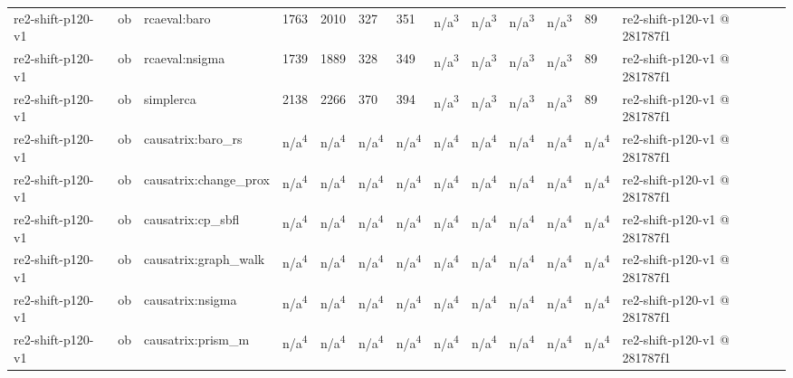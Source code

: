 \begin{table}[t]
\begin{tabular}{lllllllllllll}
re2-shift-p120-v1 & ob & rcaeval:baro & 1763 & 2010 & 327 & 351 & n/a\textsuperscript{3} & n/a\textsuperscript{3} & n/a\textsuperscript{3} & n/a\textsuperscript{3} & 89 & re2-shift-p120-v1 @ 281787f1 \\
re2-shift-p120-v1 & ob & rcaeval:nsigma & 1739 & 1889 & 328 & 349 & n/a\textsuperscript{3} & n/a\textsuperscript{3} & n/a\textsuperscript{3} & n/a\textsuperscript{3} & 89 & re2-shift-p120-v1 @ 281787f1 \\
re2-shift-p120-v1 & ob & simplerca & 2138 & 2266 & 370 & 394 & n/a\textsuperscript{3} & n/a\textsuperscript{3} & n/a\textsuperscript{3} & n/a\textsuperscript{3} & 89 & re2-shift-p120-v1 @ 281787f1 \\
re2-shift-p120-v1 & ob & causatrix:baro\_rs & n/a\textsuperscript{4} & n/a\textsuperscript{4} & n/a\textsuperscript{4} & n/a\textsuperscript{4} & n/a\textsuperscript{4} & n/a\textsuperscript{4} & n/a\textsuperscript{4} & n/a\textsuperscript{4} & n/a\textsuperscript{4} & re2-shift-p120-v1 @ 281787f1 \\
re2-shift-p120-v1 & ob & causatrix:change\_prox & n/a\textsuperscript{4} & n/a\textsuperscript{4} & n/a\textsuperscript{4} & n/a\textsuperscript{4} & n/a\textsuperscript{4} & n/a\textsuperscript{4} & n/a\textsuperscript{4} & n/a\textsuperscript{4} & n/a\textsuperscript{4} & re2-shift-p120-v1 @ 281787f1 \\
re2-shift-p120-v1 & ob & causatrix:cp\_sbfl & n/a\textsuperscript{4} & n/a\textsuperscript{4} & n/a\textsuperscript{4} & n/a\textsuperscript{4} & n/a\textsuperscript{4} & n/a\textsuperscript{4} & n/a\textsuperscript{4} & n/a\textsuperscript{4} & n/a\textsuperscript{4} & re2-shift-p120-v1 @ 281787f1 \\
re2-shift-p120-v1 & ob & causatrix:graph\_walk & n/a\textsuperscript{4} & n/a\textsuperscript{4} & n/a\textsuperscript{4} & n/a\textsuperscript{4} & n/a\textsuperscript{4} & n/a\textsuperscript{4} & n/a\textsuperscript{4} & n/a\textsuperscript{4} & n/a\textsuperscript{4} & re2-shift-p120-v1 @ 281787f1 \\
re2-shift-p120-v1 & ob & causatrix:nsigma & n/a\textsuperscript{4} & n/a\textsuperscript{4} & n/a\textsuperscript{4} & n/a\textsuperscript{4} & n/a\textsuperscript{4} & n/a\textsuperscript{4} & n/a\textsuperscript{4} & n/a\textsuperscript{4} & n/a\textsuperscript{4} & re2-shift-p120-v1 @ 281787f1 \\
re2-shift-p120-v1 & ob & causatrix:prism\_m & n/a\textsuperscript{4} & n/a\textsuperscript{4} & n/a\textsuperscript{4} & n/a\textsuperscript{4} & n/a\textsuperscript{4} & n/a\textsuperscript{4} & n/a\textsuperscript{4} & n/a\textsuperscript{4} & n/a\textsuperscript{4} & re2-shift-p120-v1 @ 281787f1 \\

\end{tabular}
\end{table}
